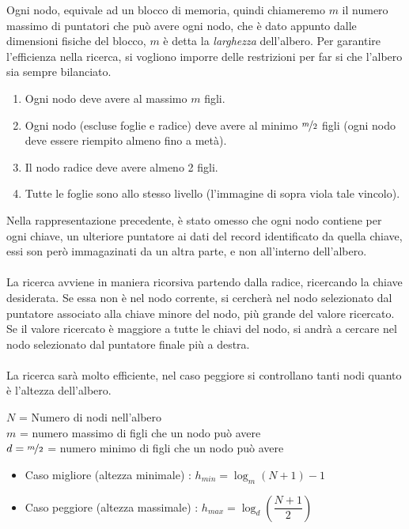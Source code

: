 \documentclass[12pt, letterpaper]{article}
\newcommand{\acc}{\\\hphantom{}\\}
\begin{document}
Ogni nodo, equivale ad un blocco di memoria, quindi chiameremo \(m\) il numero massimo di puntatori che può 
avere ogni nodo, che è dato appunto dalle dimensioni fisiche del blocco, \(m\) è detta la \textit{larghezza} 
dell'albero. Per garantire l'efficienza nella ricerca, si vogliono imporre delle restrizioni per far si che 
l'albero sia sempre bilanciato.\begin{enumerate}
    \item Ogni nodo deve avere al massimo \(m\) figli.
    \item Ogni nodo (escluse foglie e radice) deve avere al minimo \(\nicefrac{m}{2}\) figli (ogni nodo deve essere 
    riempito almeno fino a metà).
    \item Il nodo radice deve avere almeno 2 figli.
    \item Tutte le foglie sono allo stesso livello (l'immagine di sopra viola tale vincolo).
\end{enumerate}
Nella rappresentazione precedente, è stato omesso che ogni nodo contiene per ogni chiave, un ulteriore puntatore ai 
dati del record identificato da quella chiave, essi son però immagazinati da un altra parte, e non all'interno dell'albero.\acc 
La ricerca avviene in maniera ricorsiva partendo dalla radice, ricercando la chiave desiderata. Se essa non è 
nel nodo corrente, si cercherà nel nodo selezionato dal puntatore associato alla chiave minore del nodo, più grande del valore ricercato. 
Se il valore ricercato è maggiore a tutte le chiavi del nodo, si andrà a cercare nel nodo selezionato dal puntatore finale più a destra.\acc 
La ricerca sarà molto efficiente, nel caso peggiore si controllano tanti nodi quanto è l'altezza dell'albero.
\begin{center}
    \(N\) = Numero di nodi nell'albero\\ \(m\) = numero massimo di figli che un nodo può avere\\
    \(d=\nicefrac{m}{2}\) =  numero minimo di figli che un nodo può avere
\end{center}
\begin{itemize}
    \item Caso migliore (altezza minimale) : \(h_{min}=\log_m(N+1)-1\)
    \item Caso peggiore (altezza massimale) : \(h_{max}=\log_d(\dfrac{N+1}{2})\)
\end{itemize}
\end{document}
